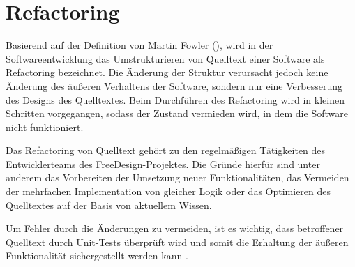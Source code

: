 \section{Refactoring}

Basierend auf der Definition von Martin Fowler (\citeyear[S. 79-80]{Fowler2020}), wird in der Softwareentwicklung das Umstrukturieren von Quelltext einer Software als Refactoring bezeichnet. Die Änderung der Struktur verursacht jedoch keine Änderung des äußeren Verhaltens der Software, sondern nur eine Verbesserung des Designs des Quelltextes.
Beim Durchführen des Refactoring wird in kleinen Schritten vorgegangen, sodass der Zustand vermieden wird, in dem die Software nicht funktioniert.  

Das Refactoring von Quelltext gehört zu den regelmäßigen Tätigkeiten des Entwicklerteams des FreeDesign-Projektes. Die Gründe hierfür sind unter anderem das Vorbereiten der Umsetzung neuer Funktionalitäten, das Vermeiden der mehrfachen Implementation von gleicher Logik oder das Optimieren des Quelltextes auf der Basis von aktuellem Wissen.

Um Fehler durch die Änderungen zu vermeiden, ist es wichtig, dass betroffener Quelltext durch Unit-Tests überprüft wird und somit die Erhaltung der äußeren Funktionalität sichergestellt werden kann \autocite[vgl.][211]{ThomasAndHunt2020}. 
